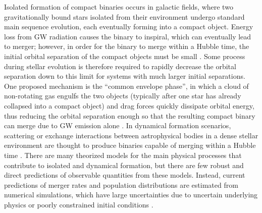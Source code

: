 Isolated formation of compact binaries occurs in galactic fields, where two gravitationally bound stars isolated from their environment undergo standard main sequence evolution, each eventually forming into a compact object. Energy loss from GW radiation causes the binary to inspiral, which can eventually lead to merger; however, in order for the binary to merge within a Hubble time, the initial orbital separation of the compact objects must be small \citep{10.1051/0004-6361/201936204,10.1007/s41114-021-00034-3}. Some process during stellar evolution is therefore required to rapidly decrease the orbital separation down to this limit for systems with much larger initial separations. One proposed mechanism is the ``common envelope phase'', in which a cloud of non-rotating gas engulfs the two objects (typically after one star has already collapsed into a compact object) and drag forces quickly dissipate orbital energy, thus reducing the orbital separation enough so that the resulting compact binary can merge due to GW emission alone \citep{10.1038/nature18322}. In dynamical formation scenarios, scattering or exchange interactions between astrophysical bodies in a dense stellar environment are thought to produce binaries capable of merging within a Hubble time \citep{1602.02444}. There are many theorized models for the main physical processes that contribute to isolated and dynamical formation, but there are few robust and direct predictions of observable quantities from these models. Instead, current predictions of merger rates and population distributions are estimated from numerical simulations, which have large uncertainties due to uncertain underlying physics or poorly constrained initial conditions \citep{10.1007/s41114-021-00034-3, 10.1051/0004-6361/201936204, 1806.00001v3, 1308.1546}. 

